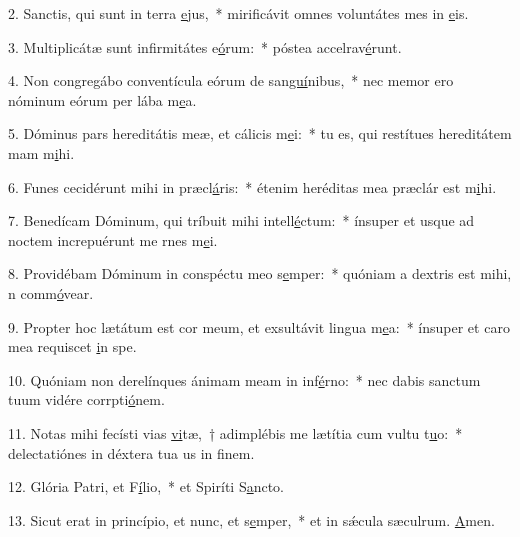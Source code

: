 2. Sanctis, qui sunt in terra \uline{e}jus,~* mirificávit omnes voluntátes mes in \uline{e}is.\par 
3. Multiplicátæ sunt infirmitátes e\uline{ó}rum:~* póstea accelrav\uline{é}runt.\par 
4. Non congregábo conventícula eórum de san\uline{guí}nibus,~* nec memor ero nóminum eórum per lába m\uline{e}a.\par 
5. Dóminus pars hereditátis meæ, et cálicis m\uline{e}i:~* tu es, qui restítues hereditátem mam m\uline{i}hi.\par 
6. Funes cecidérunt mihi in præcl\uline{á}ris:~* étenim heréditas mea præclár est m\uline{i}hi.\par 
7. Benedícam Dóminum, qui tríbuit mihi intell\uline{é}ctum:~* ínsuper et usque ad noctem increpuérunt me rnes m\uline{e}i.\par 
8. Providébam Dóminum in conspéctu meo s\uline{e}mper:~* quóniam a dextris est mihi, n comm\uline{ó}vear.\par 
9. Propter hoc lætátum est cor meum, et exsultávit lingua m\uline{e}a:~* ínsuper et caro mea requiscet \uline{i}n spe.\par 
10. Quóniam non derelínques ánimam meam in inf\uline{é}rno:~* nec dabis sanctum tuum vidére corrpti\uline{ó}nem.\par 
11. Notas mihi fecísti vias \uline{vi}tæ,~† adimplébis me lætítia cum vultu t\uline{u}o:~* delectatiónes in déxtera tua us in f\uline{i}nem.\par 
12. Glória Patri, et F\uline{í}lio,~* et Spiríti S\uline{a}ncto.\par 
13. Sicut erat in princípio, et nunc, et s\uline{e}mper,~* et in sǽcula sæculrum. \uline{A}men.\par 
